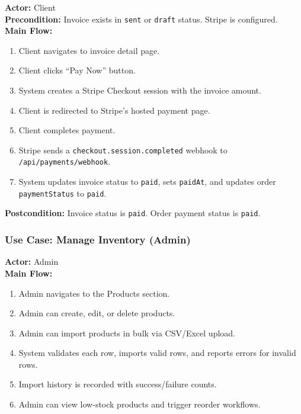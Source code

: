 \documentclass[12pt,onecolumn]{IEEEtran}
\begin{document}
\begin{tcolorbox}[reqbox,title={UC-02: Pay Invoice via Stripe}]
\textbf{Actor:} Client \\
\textbf{Precondition:} Invoice exists in \texttt{sent} or \texttt{draft} status. Stripe is configured. \\
\textbf{Main Flow:}
\begin{enumerate}[leftmargin=1.5em]
  \item Client navigates to invoice detail page.
  \item Client clicks ``Pay Now'' button.
  \item System creates a Stripe Checkout session with the invoice amount.
  \item Client is redirected to Stripe's hosted payment page.
  \item Client completes payment.
  \item Stripe sends a \texttt{checkout.session.completed} webhook to \texttt{/api/payments/webhook}.
  \item System updates invoice status to \texttt{paid}, sets \texttt{paidAt}, and updates order \texttt{paymentStatus} to \texttt{paid}.
\end{enumerate}
\textbf{Postcondition:} Invoice status is \texttt{paid}. Order payment status is \texttt{paid}.
\end{tcolorbox}

\subsubsection{Use Case: Manage Inventory (Admin)}

\begin{tcolorbox}[reqbox,title={UC-03: Admin Inventory Management}]
\textbf{Actor:} Admin \\
\textbf{Main Flow:}
\begin{enumerate}[leftmargin=1.5em]
  \item Admin navigates to the Products section.
  \item Admin can create, edit, or delete products.
  \item Admin can import products in bulk via CSV/Excel upload.
  \item System validates each row, imports valid rows, and reports errors for invalid rows.
  \item Import history is recorded with success/failure counts.
  \item Admin can view low-stock products and trigger reorder workflows.
\end{enumerate}
\end{tcolorbox}
\end{document}
